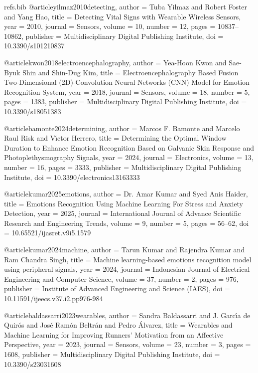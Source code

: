 \begin{filecontents*}[overwrite]{refs.bib}
@article{yilmaz2010detecting,
  author = {Tuba Yilmaz and Robert Foster and Yang Hao},
  title = {{Detecting Vital Signs with Wearable Wireless Sensors}},
  year = {2010},
  journal = {Sensors},
  volume = {10},
  number = {12},
  pages = {10837--10862},
  publisher = {Multidisciplinary Digital Publishing Institute},
  doi = {10.3390/s101210837}
}

@article{kwon2018electroencephalography,
  author = {Yea-Hoon Kwon and Sae-Byuk Shin and Shin{-}Dug Kim},
  title = {{Electroencephalography Based Fusion Two-Dimensional (2D)-Convolution Neural Networks (CNN) Model for Emotion Recognition System}},
  year = {2018},
  journal = {Sensors},
  volume = {18},
  number = {5},
  pages = {1383},
  publisher = {Multidisciplinary Digital Publishing Institute},
  doi = {10.3390/s18051383}
}

@article{bamonte2024determining,
  author = {Marcos F. Bamonte and Marcelo  Raul Risk and V{\'\i}ctor Herrero},
  title = {{Determining the Optimal Window Duration to Enhance Emotion Recognition Based on Galvanic Skin Response and Photoplethysmography Signals}},
  year = {2024},
  journal = {Electronics},
  volume = {13},
  number = {16},
  pages = {3333},
  publisher = {Multidisciplinary Digital Publishing Institute},
  doi = {10.3390/electronics13163333}
}

@article{kumar2025emotions,
  author = {Dr. Amar Kumar and Syed Anis Haider},
  title = {{Emotions Recognition Using Machine Learning For Stress and Anxiety Detection}},
  year = {2025},
  journal = {International Journal of Advance Scientific Research and Engineering Trends},
  volume = {9},
  number = {5},
  pages = {56--62},
  doi = {10.65521/ijasret.v9i5.1579}
}

@article{kumar2024machine,
  author = {Tarun Kumar and Rajendra Kumar and Ram Chandra Singh},
  title = {{Machine learning-based emotions recognition model using peripheral signals}},
  year = {2024},
  journal = {Indonesian Journal of Electrical Engineering and Computer Science},
  volume = {37},
  number = {2},
  pages = {976},
  publisher = {Institute of Advanced Engineering and Science (IAES)},
  doi = {10.11591/ijeecs.v37.i2.pp976-984}
}

@article{baldassarri2023wearables,
  author = {Sandra Baldassarri and J. Garc{\'\i}a de Quir{\'o}s and Jos{\'e} Ram{\'o}n Beltr{\'a}n and Pedro {\'A}lvarez},
  title = {{Wearables and Machine Learning for Improving Runners' Motivation from an Affective Perspective}},
  year = {2023},
  journal = {Sensors},
  volume = {23},
  number = {3},
  pages = {1608},
  publisher = {Multidisciplinary Digital Publishing Institute},
  doi = {10.3390/s23031608}
}


\end{filecontents*}

